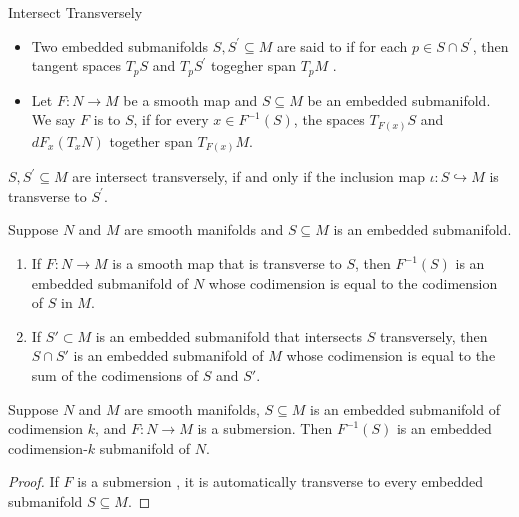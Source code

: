 \documentclass[../main.tex]{subfiles}
\begin{document}
\begin{definition}{Intersect Transversely}{}
   \begin{itemize}
    \item  Two embedded submanifolds \(  S,S^{\prime} \subseteq M  \) are said to  if for each \(  p \in S\cap S^{\prime}   \), then tangent spaces \(  T_{p}S  \) and \(  T_{p}S^{\prime}   \) togegher span \(  T_{p}M  \)   .
    \item Let  \(  F:N\to M  \)  be a smooth map and \(  S\subseteq M  \) be an embedded submanifold. We say \(  F  \) is  to \(  S  \), if for every \(  x \in F^{-1} \left( S \right)   \), the spaces \(  T_{F\left( x \right) }S  \) and \(  d F_{x}\left( T_{x}N \right)   \) together span \(  T_{F\left( x \right) }M  \).      
   \end{itemize}
     
\end{definition}

\begin{remark}
    \(  S,S^{\prime} \subseteq M  \) are intersect transversely, if and only if  the inclusion map \(  \iota : S\hookrightarrow  M  \) is transverse to \(  S^{\prime}   \). 
\end{remark}
\begin{theorem}{}{}
Suppose $N$ and $M$ are smooth manifolds and $S \subseteq M$ is an embedded submanifold.

\begin{enumerate}
    \item[(a)] If $F: N \to M$ is a smooth map that is transverse to $S$, then $F^{-1}(S)$ is an embedded submanifold of $N$ whose codimension is equal to the codimension of $S$ in $M$.
    \item[(b)] If $S' \subset M$ is an embedded submanifold that intersects $S$ transversely, then $S \cap S'$ is an embedded submanifold of $M$ whose codimension is equal to the sum of the codimensions of $S$ and $S'$.
\end{enumerate}
\end{theorem}
\begin{corollary}{}{}
Suppose $N$ and $M$ are smooth manifolds, $S \subseteq M$ is an embedded submanifold of codimension $k$, and $F: N \to M$ is a submersion. Then $F^{-1}(S)$ is an embedded codimension-$k$ submanifold of $N$.
\end{corollary}
\begin{proof}
    If \(  F  \) is a submersion , it is automatically transverse to every embedded submanifold \(  S\subseteq M  \).  
\end{proof}
\end{document}

